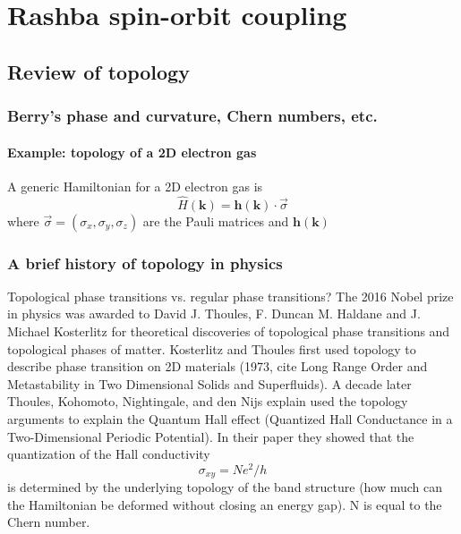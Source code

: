 
\renewcommand{\thechapter}{7}

\chapter{Rashba spin-orbit coupling}

\section{Review of topology}

\subsection{Berry's phase and curvature, Chern numbers, etc.}

\subsubsection{Example: topology of a 2D electron gas}
A generic Hamiltonian for a 2D electron gas is 
%
\begin{equation}
	\hat{H}(\mathbf{k})= \mathbf{h}(\mathbf{k})\cdot\vec{\sigma}
	\label{eq:2D_Hamiltonian}
\end{equation}
%
where $\vec{\sigma}=(\sigma_x, \sigma_y, \sigma_z)$ are the Pauli matrices and $\mathbf{h}(\mathbf{k})$
\subsection{A brief history of topology in physics}
Topological phase transitions vs. regular phase transitions?
The 2016 Nobel prize in physics was awarded to David J. Thoules, F. Duncan M. Haldane and J. Michael Kosterlitz for theoretical discoveries of topological phase transitions and topological phases of matter. Kosterlitz and Thoules first used topology to describe phase transition on 2D materials (1973, cite Long Range Order and Metastability in Two Dimensional Solids and Superfluids). A decade later Thoules, Kohomoto, Nightingale, and den Nijs explain used the topology arguments to explain the Quantum Hall effect (Quantized Hall Conductance in a Two-Dimensional Periodic Potential). In their paper they showed that the quantization of the Hall conductivity
%
\begin{equation}
	\sigma_{xy} = Ne^2/h
	\label{eq:hall_conductivity}
\end{equation}
%
is determined by the underlying topology of the band structure (how much can the Hamiltonian be deformed without closing an energy gap). N is equal to the Chern number. 




